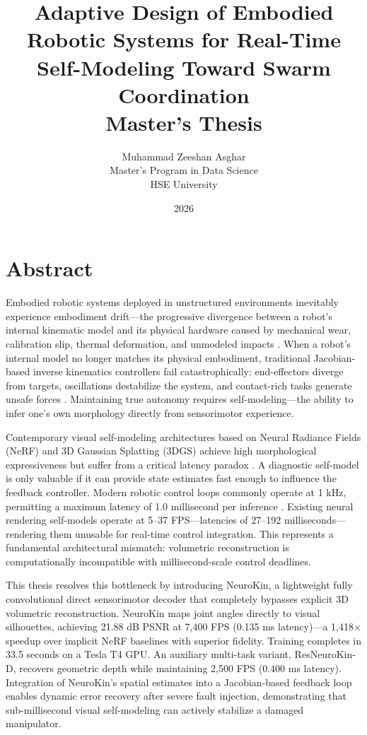 \documentclass[12pt,a4paper,oneside]{report}
\title{
    \vspace{2cm}
    \textbf{\Large Adaptive Design of Embodied Robotic Systems for Real-Time Self-Modeling Toward Swarm Coordination} \\
    \vspace{1cm}
    \large Master's Thesis
}
\author{
    Muhammad Zeeshan Asghar \\
    Master's Program in Data Science \\
    HSE University
}
\date{\vspace{1cm} 2026}
\begin{document}
\maketitle
\clearpage

\chapter*{Abstract}

Embodied robotic systems deployed in unstructured environments inevitably experience embodiment drift---the progressive divergence between a robot's internal kinematic model and its physical hardware caused by mechanical wear, calibration slip, thermal deformation, and unmodeled impacts \cite{bongard2006resilient, cully2015robots}. When a robot's internal model no longer matches its physical embodiment, traditional Jacobian-based inverse kinematics controllers fail catastrophically: end-effectors diverge from targets, oscillations destabilize the system, and contact-rich tasks generate unsafe forces \cite{kwiatkowski2019task, chen2022full}. Maintaining true autonomy requires self-modeling---the ability to infer one's own morphology directly from sensorimotor experience.

Contemporary visual self-modeling architectures based on Neural Radiance Fields (NeRF) and 3D Gaussian Splatting (3DGS) achieve high morphological expressiveness but suffer from a critical latency paradox \cite{hu2024teaching, hu2025learning}. A diagnostic self-model is only valuable if it can provide state estimates fast enough to influence the feedback controller. Modern robotic control loops commonly operate at 1 kHz, permitting a maximum latency of 1.0 millisecond per inference \cite{siciliano2009robotics}. Existing neural rendering self-models operate at 5--37 FPS---latencies of 27--192 milliseconds---rendering them unusable for real-time control integration. This represents a fundamental architectural mismatch: volumetric reconstruction is computationally incompatible with millisecond-scale control deadlines.

This thesis resolves this bottleneck by introducing NeuroKin, a lightweight fully convolutional direct sensorimotor decoder that completely bypasses explicit 3D volumetric reconstruction. NeuroKin maps joint angles directly to visual silhouettes, achieving 21.88 dB PSNR at 7,400 FPS (0.135 ms latency)---a 1,418$\times$ speedup over implicit NeRF baselines with superior fidelity. Training completes in 33.5 seconds on a Tesla T4 GPU. An auxiliary multi-task variant, ResNeuroKin-D, recovers geometric depth while maintaining 2,500 FPS (0.400 ms latency). Integration of NeuroKin's spatial estimates into a Jacobian-based feedback loop enables dynamic error recovery after severe fault injection, demonstrating that sub-millisecond visual self-modeling can actively stabilize a damaged manipulator.
\end{document}
